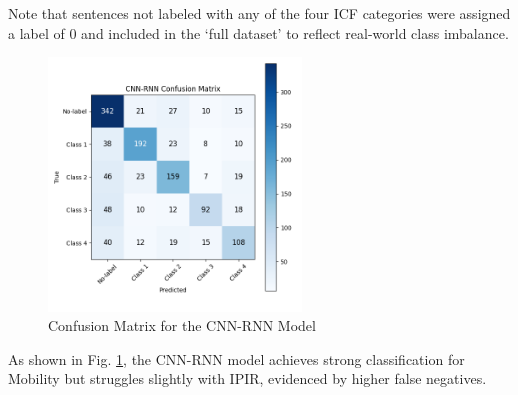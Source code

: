 Note that sentences not labeled with any of the four ICF categories were assigned a label of 0 and included in the ‘full dataset’ to reflect real-world class imbalance.

\begin{figure}[H]
\centering
\includegraphics[width=0.6\textwidth]{images/Supervised_Results/cnn-rnn_confusion_matrix.png}
\caption{Confusion Matrix for the CNN-RNN Model}
\label{fig:cnn-rnn-confusion-matrix}
\end{figure}

As shown in Fig. \ref{fig:cnn-rnn-confusion-matrix}, the CNN-RNN model achieves strong classification for Mobility but struggles slightly with IPIR, evidenced by higher false negatives.

